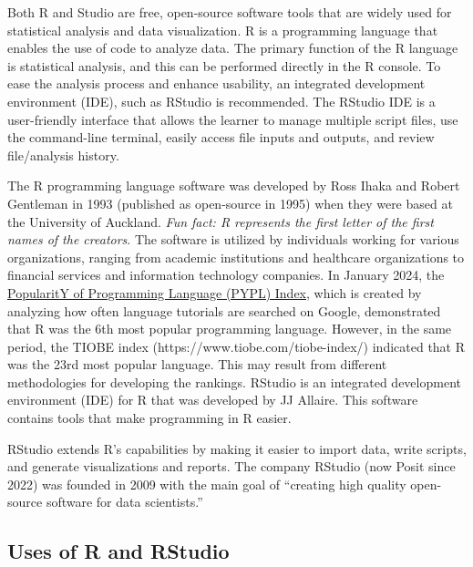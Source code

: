 \documentclass[
  letterpaper,
  DIV=11,
  numbers=noendperiod]{scrreprt}
\begin{document}
Both R and Studio are free, open-source software tools that are widely
used for statistical analysis and data visualization. R is a programming
language that enables the use of code to analyze data. The primary
function of the R language is statistical analysis, and this can be
performed directly in the R console. To ease the analysis process and
enhance usability, an integrated development environment (IDE), such as
RStudio is recommended. The RStudio IDE is a user-friendly interface
that allows the learner to manage multiple script files, use the
command-line terminal, easily access file inputs and outputs, and review
file/analysis history.

The R programming language software was developed by Ross Ihaka and
Robert Gentleman in 1993 (published as open-source in 1995) when they
were based at the University of Auckland. \emph{Fun fact: R represents
the first letter of the first names of the creators}. The software is
utilized by individuals working for various organizations, ranging from
academic institutions and healthcare organizations to financial services
and information technology companies. In January 2024, the
\href{https://pypl.github.io/PYPL.html}{PopularitY of Programming
Language (PYPL) Index}, which is created by analyzing how often language
tutorials are searched on Google, demonstrated that R was the 6th most
popular programming language. However, in the same period, the TIOBE
index (https://www.tiobe.com/tiobe-index/) indicated that R was the 23rd
most popular language. This may result from different methodologies for
developing the rankings. RStudio is an integrated development
environment (IDE) for R that was developed by JJ Allaire. This software
contains tools that make programming in R easier.

RStudio extends R's capabilities by making it easier to import data,
write scripts, and generate visualizations and reports. The company
RStudio (now Posit since 2022) was founded in 2009 with the main goal of
``creating high quality open-source software for data scientists.''

\subsection{Uses of R and RStudio}\label{uses-of-r-and-rstudio}
\end{document}
